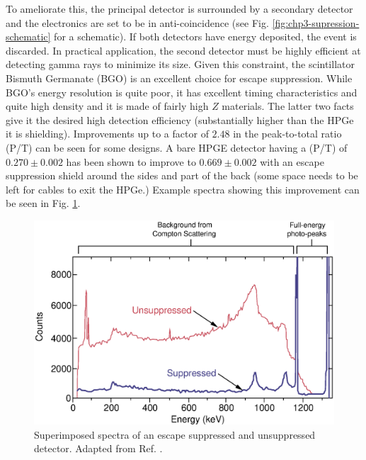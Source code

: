 To ameliorate this, the principal detector is surrounded by a secondary detector and the electronics are set to be in anti-coincidence (see Fig. \ref{fig:chp3-supression-schematic} for a schematic). If both detectors have energy deposited, the event is discarded. In practical application, the second detector must be highly efficient at detecting gamma rays to minimize its size. Given this constraint, the scintillator Bismuth Germanate (BGO) is an excellent choice for escape suppression. While BGO's energy resolution is quite poor, it has excellent timing characteristics and quite high density and it is made of fairly high $Z$ materials. The latter two facts give it the desired high detection efficiency (substantially higher than the HPGe it is shielding). Improvements up to a factor of $2.48$ in the peak-to-total ratio (P/T) can be seen for some designs. A bare HPGE detector having a (P/T) of $0.270\pm0.002$ has been shown to improve to $0.669\pm0.002$\cite{GSComptonSuppression} with an escape suppression shield around the sides and part of the back (some space needs to be left for cables to exit the HPGe.) Example spectra showing this improvement can be seen in Fig. \ref{fig:chp3-supression-improvement}.

\begin{figure}[h!]
	\centerline{\includegraphics[height=0.25\textheight]{./img/c3/suppressed_spectra.eps}}
	\caption{Superimposed spectra of an escape suppressed and unsuppressed detector. Adapted from Ref. \cite{gsBooklet}.}
	\label{fig:chp3-supression-improvement}
\end{figure}


